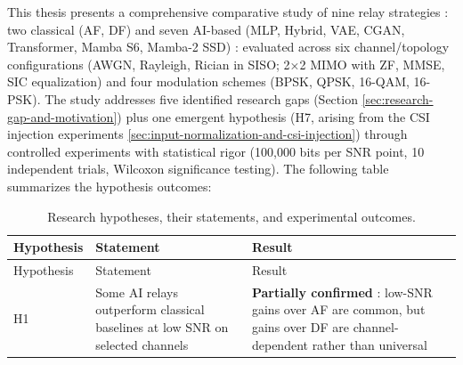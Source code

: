 This thesis presents a comprehensive comparative study of nine relay strategies : two classical (AF, DF) and seven AI-based (MLP, Hybrid, VAE, CGAN, Transformer, Mamba S6, Mamba-2 SSD) : evaluated across six channel/topology configurations (AWGN, Rayleigh, Rician in SISO; 2×2 MIMO with ZF, MMSE, SIC equalization) and four modulation schemes (BPSK, QPSK, 16-QAM, 16-PSK). The study addresses five identified research gaps (Section \ref{sec:research-gap-and-motivation}) plus one emergent hypothesis (H7, arising from the CSI injection experiments \ref{sec:input-normalization-and-csi-injection}) through controlled experiments with statistical rigor (100,000 bits per SNR point, 10 independent trials, Wilcoxon significance testing). The following table summarizes the hypothesis outcomes:

\begin{longtable}[]{@{}
  >{\raggedright\arraybackslash}p{}
  >{\raggedright\arraybackslash}p{}
  >{\raggedright\arraybackslash}p{}@{}}
\caption{Research hypotheses, their statements, and experimental outcomes.}\label{tbl:table33}\tabularnewline
\toprule\noalign{}
\begin{minipage}[b]{\linewidth}\raggedright
Hypothesis
\end{minipage} & \begin{minipage}[b]{\linewidth}\raggedright
Statement
\end{minipage} & \begin{minipage}[b]{\linewidth}\raggedright
Result
\end{minipage} \\
\midrule\noalign{}
\endfirsthead
\toprule\noalign{}
\begin{minipage}[b]{\linewidth}\raggedright
Hypothesis
\end{minipage} & \begin{minipage}[b]{\linewidth}\raggedright
Statement
\end{minipage} & \begin{minipage}[b]{\linewidth}\raggedright
Result
\end{minipage} \\
\midrule\noalign{}
\endhead
\bottomrule\noalign{}
\endlastfoot
H1 & Some AI relays outperform classical baselines at low SNR on selected channels & \textbf{Partially confirmed} : low-SNR gains over AF are common, but gains over DF are channel-dependent rather than universal \\

\end{longtable}
